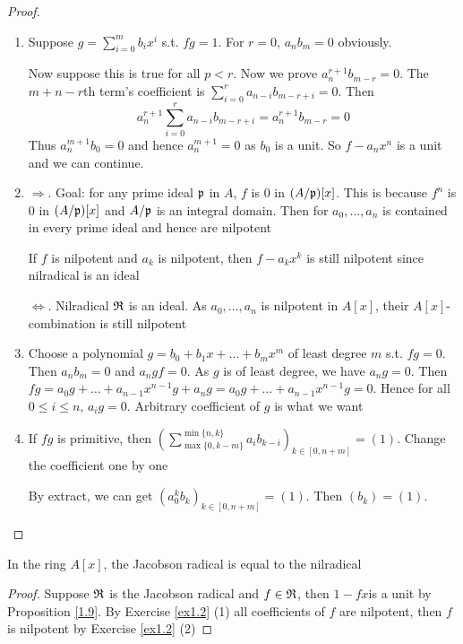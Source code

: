 \documentclass[11pt]{article}
\begin{document}
\begin{proof}
\begin{enumerate}
\item Suppose \(g=\sum_{i=0}^mb_ix^i\) s.t. \(fg=1\). For \(r=0\), \(a_nb_m=0\) obviously.

Now suppose this is true for all \(p<r\). Now we prove \(a_n^{r+1}b_{m-r}=0\). The \(m+n-r\)th term's
coefficient is \(\sum_{i=0}^ra_{n-i}b_{m-r+i}=0\). Then
\begin{equation*}
a_n^{r+1}\sum_{i=0}^ra_{n-i}b_{m-r+i}=a_n^{r+1}b_{m-r}=0
\end{equation*}
Thus \(a_n^{m+1}b_0=0\) and hence \(a_n^{m+1}=0\) as \(b_0\) is a unit. So \(f-a_nx^n\) is a
unit and we can continue.

\item \(\Rightarrow\). Goal: for any prime ideal \(\mathfrak{p}\) in \(A\), \(f\) is 0 in \((A/\mathfrak{p})[x]\). This is
because \(f^n\) is 0 in \((A/\mathfrak{p})[x]\) and \(A/\mathfrak{p}\) is an integral domain. Then for \(a_0,\dots,a_n\)
is contained in every prime ideal and hence are nilpotent

If \(f\) is nilpotent and \(a_k\) is nilpotent, then \(f-a_kx^k\) is still nilpotent since
nilradical is an ideal

\(\Leftrightarrow\). Nilradical \(\mathfrak{R}\) is an ideal. As \(a_0,\dots,a_n\) is nilpotent in \(A[x]\),
their \(A[x]\)-combination is still nilpotent

\item Choose a polynomial \(g=b_0+b_1x+\dots+b_mx^m\) of least degree \(m\) s.t. \(fg=0\).
Then \(a_nb_m=0\) and \(a_ngf=0\). As \(g\) is of least degree, we have \(a_ng=0\). Then
\(fg=a_0g+\dots+a_{n-1}x^{n-1}g+a_ng=a_0g+\dots+a_{n-1}x^{n-1}g=0\). Hence for
all \(0\le i\le n\), \(a_ig=0\). Arbitrary coefficient of \(g\) is what we want

\item If \(fg\) is primitive, then \((\sum^{\min\{n,k\}}_{\max\{0,k-m\}}a_ib_{k-i})_{k\in[0,n+m]}=(1)\).
Change the coefficient one by one

By extract, we can get \((a_0^kb_k)_{k\in[0,n+m]}=(1)\). Then \((b_k)=(1)\).
\end{enumerate}
\end{proof}

\begin{exercise}
\label{ex1.4}
In the ring \(A[x]\), the Jacobson radical is equal to the nilradical
\end{exercise}

\begin{proof}
Suppose \(\mathfrak{R}\) is the Jacobson radical and \(f\in\mathfrak{R}\), then \(1-fx\)is a unit by Proposition
\ref{1.9}. By Exercise \ref{ex1.2} (1) all coefficients of \(f\) are nilpotent, then \(f\) is
nilpotent by Exercise \ref{ex1.2} (2)
\end{proof}
\end{document}
